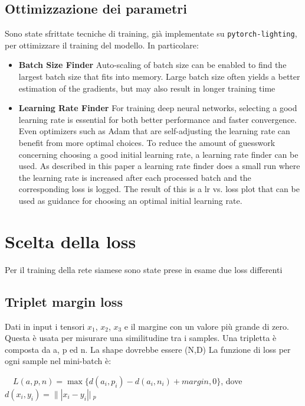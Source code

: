 \documentclass[11pt]{article}
\begin{document}
\subsection{Ottimizzazione dei parametri}

Sono state sfrittate tecniche di training, già implementate su \texttt{pytorch-lighting}, per ottimizzare il training del modello. In particolare:

\begin{itemize}
    \item \textbf{Batch Size Finder} Auto-scaling of batch size can be enabled to find the largest batch size that fits into memory. Large batch size often yields a better estimation of the gradients, but may also result in longer training time
    \item \textbf{Learning Rate Finder} For training deep neural networks, selecting a good learning rate is essential for both better performance and faster convergence. Even optimizers such as Adam that are self-adjusting the learning rate can benefit from more optimal choices. To reduce the amount of guesswork concerning choosing a good initial learning rate, a learning rate finder can be used. As described in this paper a learning rate finder does a small run where the learning rate is increased after each processed batch and the corresponding loss is logged. The result of this is a lr vs. loss plot that can be used as guidance for choosing an optimal initial learning rate.
\end{itemize}

\section{Scelta della loss}

Per il training della rete siamese sono state prese in esame due loss differenti

\subsection{Triplet margin loss}
Dati in input i tensori $x_1$, $x_2$, $x_3$ e il margine con un valore più grande di zero.
Questa è usata per misurare una similitudine tra i samples. Una tripletta è composta da a, p ed n. La shape dovrebbe essere (N,D)
La funzione di loss per ogni sample nel mini-batch è:


\begin{center}
    \ \
    $L(a,p,n) = \max{ \{ d(a_i, p_i) - d(a_i, n_i) + margin, 0 \} }$, dove
    \\
    $d(x_i, y_i) = \|| x_i - y_i ||\ _p$
    \ \
\end{center}
\end{document}
